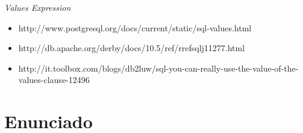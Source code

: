 \documentclass[a4paper,10pt]{article}
\begin{document}
\newpage



\begin{thebibliography}{9}

  \emph{Values Expression}
  \begin{itemize}
    \item http://www.postgresql.org/docs/current/static/sql-values.html 
    \item http://db.apache.org/derby/docs/10.5/ref/rrefsqlj11277.html 
    \item http://it.toolbox.com/blogs/db2luw/sql-you-can-really-use-the-value-of-the-values-clause-12496 
  \end{itemize}

\end{thebibliography}


\appendix
\newpage
\section{Enunciado}
  
  
  
\end{document}

